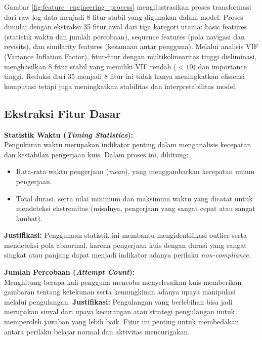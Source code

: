 Gambar \ref{fig:feature_engineering_process} mengilustrasikan proses transformasi dari raw log data menjadi 8 fitur stabil yang digunakan dalam model. Proses dimulai dengan ekstraksi 35 fitur awal dari tiga kategori utama: basic features (statistik waktu dan jumlah percobaan), sequence features (pola navigasi dan revisits), dan similarity features (kesamaan antar pengguna). Melalui analisis VIF (Variance Inflation Factor), fitur-fitur dengan multikolinearitas tinggi dieliminasi, menghasilkan 8 fitur stabil yang memiliki VIF rendah ($<10$) dan importance tinggi. Reduksi dari 35 menjadi 8 fitur ini tidak hanya meningkatkan efisiensi komputasi tetapi juga meningkatkan stabilitas dan interpretabilitas model.

\subsection{Ekstraksi Fitur Dasar}
\label{sec:ekstraksiFiturDasar}
\textbf{Statistik Waktu (\textit{Timing Statistics}):} \\
Pengukuran waktu merupakan indikator penting dalam menganalisis kecepatan dan kestabilan pengerjaan kuis. Dalam proses ini, dihitung:
\begin{itemize}
    \item Rata-rata waktu pengerjaan (\textit{mean}), yang menggambarkan kecepatan umum pengerjaan.
    \item Total durasi, serta nilai minimum dan maksimum waktu yang dicatat untuk mendeteksi ekstremitas (misalnya, pengerjaan yang sangat cepat atau sangat lambat).
\end{itemize}
\textbf{Justifikasi:} Penggunaan statistik ini membantu mengidentifikasi outlier serta mendeteksi pola abnormal, karena pengerjaan kuis dengan durasi yang sangat singkat atau panjang dapat menjadi indikator adanya perilaku \textit{non-compliance}.

\textbf{Jumlah Percobaan (\textit{Attempt Count}):} \\
Menghitung berapa kali pengguna mencoba menyelesaikan kuis memberikan gambaran tentang ketekunan serta kemungkinan adanya upaya manipulasi melalui pengulangan.
\textbf{Justifikasi:} Pengulangan yang berlebihan bisa jadi merupakan sinyal dari upaya kecurangan atau strategi pengulangan untuk memperoleh jawaban yang lebih baik. Fitur ini penting untuk membedakan antara perilaku belajar normal dan aktivitas mencurigakan.

